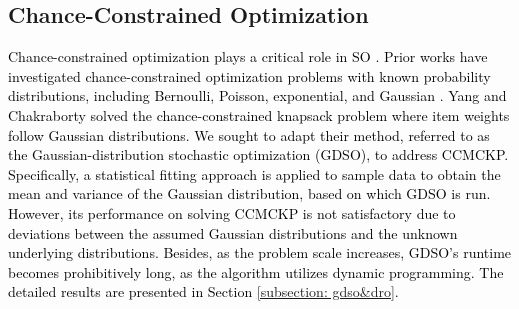\documentclass[lettersize,journal]{IEEEtran}
\begin{document}
\subsection{Chance-Constrained Optimization} 
\textcolor{black}{
Chance-constrained optimization plays a critical role in SO \cite{delage2010percentile,doerr2020optimization,shapiro2021lectures}. 
Prior works have investigated chance-constrained optimization problems with known probability distributions, including Bernoulli, Poisson, exponential, and Gaussian \cite{kleinberg1997allocating,goel1999stochastic,goyal2010ptas,8637163,9269349}.
Yang and Chakraborty \cite{yang2018algorithm} solved the chance-constrained knapsack problem where item weights follow Gaussian distributions.
We sought to adapt their method, referred to as the Gaussian-distribution stochastic optimization (GDSO), to address CCMCKP.
Specifically, a statistical fitting approach is applied to sample data to obtain the mean and variance of the Gaussian distribution, based on which GDSO is run.
However, its performance on solving CCMCKP is not satisfactory due to deviations between the assumed Gaussian distributions and the unknown underlying distributions. 
Besides, as the problem scale increases, GDSO's runtime becomes prohibitively long, as the algorithm utilizes dynamic programming.
The detailed results are presented in Section \ref{subsection: gdso&dro}.}
\end{document}
